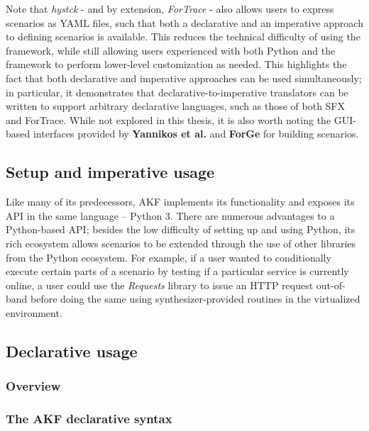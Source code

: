 Note that \emph{hystck} - and by extension, \emph{ForTrace} - also
allows users to express scenarios as YAML files, such that both a
declarative and an imperative approach to defining scenarios is
available. This reduces the technical difficulty of using the framework,
while still allowing users experienced with both Python and the
framework to perform lower-level customization as needed. This
highlights the fact that both declarative and imperative approaches can
be used simultaneously; in particular, it demonstrates that
declarative-to-imperative translators can be written to support
arbitrary declarative languages, such as those of both SFX and ForTrace.
While not explored in this thesis, it is also worth noting the GUI-based
interfaces provided by \textbf{Yannikos et al.} and \textbf{ForGe} for
building scenarios.

\subsection{Setup and imperative
usage}\label{setup-and-imperative-usage}

Like many of its predecessors, AKF implements its functionality and
exposes its API in the same language -- Python 3. There are numerous
advantages to a Python-based API; besides the low difficulty of setting
up and using Python, its rich ecosystem allows scenarios to be extended
through the use of other libraries from the Python ecosystem. For
example, if a user wanted to conditionally execute certain parts of a
scenario by testing if a particular service is currently online, a user
could use the \emph{Requests} library \cite{Requests31Documentation}
to issue an HTTP request out-of-band before doing the same using
synthesizer-provided routines in the virtualized environment.

\subsection{Declarative usage}\label{declarative-usage}

\subsubsection{Overview}\label{overview}

\subsubsection{The AKF declarative
syntax}\label{the-akf-declarative-syntax}

